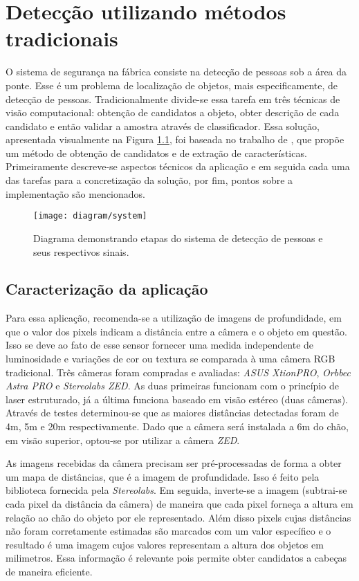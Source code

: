 \chapter{Detecção utilizando métodos tradicionais} \label{chap:tradicional}

O sistema de segurança na fábrica consiste na detecção de pessoas sob a área da ponte. Esse é um problema de localização de objetos, mais especificamente, de detecção de pessoas. Tradicionalmente divide-se essa tarefa em três técnicas de visão computacional: obtenção de candidatos a objeto, obter descrição de cada candidato e então validar a amostra através de classificador. Essa solução, apresentada visualmente na Figura \ref{fig:system}, foi baseada no trabalho de \cite{rauter}, que propõe um método de obtenção de candidatos e de extração de características. Primeiramente descreve-se aspectos técnicos da aplicação e em seguida cada uma das tarefas para a concretização da solução, por fim, pontos sobre a implementação são mencionados.

\begin{figure}
\centering
\texttt{[image: diagram/system]}
\caption{Diagrama demonstrando etapas do sistema de detecção de pessoas e seus respectivos sinais.}
\label{fig:system}
\end{figure}

\section{Caracterização da aplicação}
Para essa aplicação, recomenda-se a utilização de imagens de profundidade, em que o valor dos pixels indicam a distância entre a câmera e o objeto em questão. Isso se deve ao fato de esse sensor fornecer uma medida independente de luminosidade e variações de cor ou textura se comparada à uma câmera RGB tradicional. Três câmeras foram compradas e avaliadas: \textit{ASUS XtionPRO}, \textit{Orbbec Astra PRO} e \textit{Stereolabs ZED}. As duas primeiras funcionam com o princípio de laser estruturado, já a última funciona baseado em visão estéreo (duas câmeras). Através de testes determinou-se que as maiores distâncias detectadas foram de 4m, 5m e 20m respectivamente. Dado que a câmera será instalada a 6m do chão, em visão superior, optou-se por utilizar a câmera \textit{ZED}.

As imagens recebidas da câmera precisam ser pré-processadas de forma a obter um mapa de distâncias, que é a imagem de profundidade. Isso é feito pela biblioteca fornecida pela \textit{Stereolabs}. Em seguida, inverte-se a imagem (subtrai-se cada pixel da distância da câmera) de maneira que cada pixel forneça a altura em relação ao chão do objeto por ele representado. Além disso pixels cujas distâncias não foram corretamente estimadas são marcados com um valor específico e o resultado é uma imagem cujos valores representam a altura dos objetos em milimetros. Essa informação é relevante pois permite obter candidatos a cabeças de maneira eficiente.

